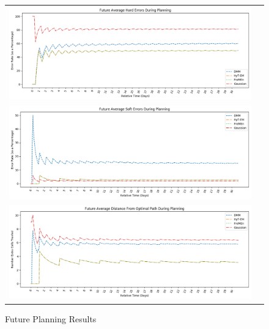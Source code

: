 \begin{center}
  \begin{figure}[!Hp]
  \begin{tabular}{cc}
    {\includegraphics[width = 6in]{images/results/Future_Average_Hard_Errors_During_Planning.png}} \\
    {\includegraphics[width = 6in]{images/results/Future_Average_Soft_Errors_During_Planning.png}} \\
    {\includegraphics[width = 6in]{images/results/Future_Average_Distance_From_Optimal_Path_During_Planning.png}} \\
  \end{tabular}
  \caption{ Future Planning Results}
  \label{fig:G_FP_res}
\end{figure}


\end{center}
